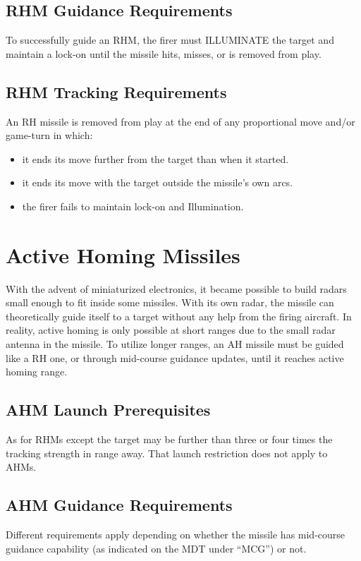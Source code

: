 \subsection{RHM Guidance Requirements} To successfully guide an RHM, the firer must ILLUMINATE the target and maintain a lock-on until the missile hits, misses, or is removed from play.

\subsection{RHM Tracking Requirements} An RH missile is removed from play at the end of any proportional move and/or game-turn in which:

\begin{itemize}

    \item it ends its move further from the target than when it started.

    \item it ends its move with the target outside the missile's own  arcs.

    \item the firer fails to maintain lock-on and Illumination.

\end{itemize}

\section{Active Homing Missiles}
\label{rule:active-radar-homing-missiles}

With the advent of miniaturized electronics, it became possible to build radars small enough to fit inside some missiles. With its own radar, the missile can theoretically guide itself to a target without any help from the firing aircraft. In reality, active homing is only possible at short ranges due to the small radar antenna in the missile. To utilize longer ranges, an AH missile must be guided like a RH one, or through mid-course guidance updates, until it reaches active homing range.

\subsection{AHM Launch Prerequisites} As for RHMs except the target may be further than three or four  times the tracking strength in range away. That launch restriction does not apply to AHMs.

\subsection{AHM Guidance Requirements} Different requirements apply depending on whether the missile has mid-course guidance capability (as indicated on the MDT under “MCG”) or not.

